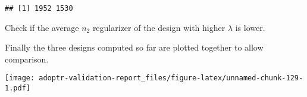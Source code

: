 \documentclass[]{book}
\newenvironment{Shaded}{\begin{snugshade}}{\end{snugshade}}
\newcommand{\DecValTok}[1]{\textcolor[rgb]{0.00,0.00,0.81}{#1}}
\newcommand{\KeywordTok}[1]{\textcolor[rgb]{0.13,0.29,0.53}{\textbf{#1}}}
\newcommand{\NormalTok}[1]{#1}
\newcommand{\OperatorTok}[1]{\textcolor[rgb]{0.81,0.36,0.00}{\textbf{#1}}}
\newcommand{\StringTok}[1]{\textcolor[rgb]{0.31,0.60,0.02}{#1}}
\begin{document}
\begin{verbatim}
## [1] 1952 1530
\end{verbatim}

\begin{Shaded}
\end{Shaded}

Check if the average \(n_2\) regularizer of the design with
higher \(\lambda\) is lower.

\begin{Shaded}
\end{Shaded}

Finally the three designs computed so far are plotted together to allow
comparison.

\texttt{[image: adoptr-validation-report\_files/figure-latex/unnamed-chunk-129-1.pdf]}


\end{document}

